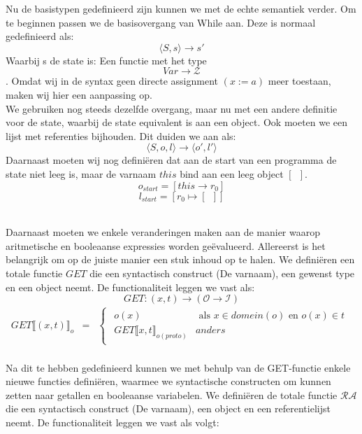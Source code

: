 \documentclass[12pt]{article}
\newcommand{\RA}{\mathcal{RA}}
\begin{document}
Nu de basistypen gedefinieerd zijn kunnen we met de echte semantiek verder. Om te beginnen passen we de basisovergang van While aan. Deze is normaal gedefinieerd als:
$$ \langle S,s \rangle \rightarrow s\prime $$
Waarbij s de state is: Een functie met het type
$$ Var \rightarrow \mathcal{Z} $$.
Omdat wij in de syntax geen directe assignment $(x := a)$ meer toestaan, maken wij hier een aanpassing op.\\
We gebruiken nog steeds dezelfde overgang, maar nu met een andere definitie voor de state, waarbij de state equivalent is aan een object. Ook moeten we een lijst met referenties bijhouden. Dit duiden we aan als:
$$ \langle S,o,l \rangle \rightarrow \langle o\prime, l\prime \rangle $$
Daarnaast moeten wij nog definiëren dat aan de start van een programma de state niet leeg is, maar de varnaam $ this $ bind aan een leeg object $ [\enspace] $.
$$ o_{start} = [this \rightarrow r_0]$$
$$ l_{start} = [r_0 \mapsto [ \enspace ]]$$
\\
\par
Daarnaast moeten we enkele veranderingen maken aan de manier waarop aritmetische en booleaanse expressies worden geëvalueerd. 
Allereerst is het belangrijk om op de juiste manier een stuk inhoud op te halen. We definiëren een totale functie $GET$ die een syntactisch construct (De varnaam), een gewenst type en een object neemt. De functionaliteit leggen we vast als:
\[ GET: (x,t) \rightarrow (\mathcal{O} \rightarrow \mathcal{I}) \]
\[
\begin{matrix}
GET\llbracket (x,t) \rrbracket_o & = & 
\begin{cases}
\begin{matrix}
o(x) & \mbox{ als } x \in domein(o) \mbox{ en } o(x) \in t\\
GET\llbracket x,t \rrbracket_{o(proto)} & anders
\end{matrix}
\end{cases}\\
\end{matrix}
\]

Na dit te hebben gedefinieerd kunnen we met behulp van de GET-functie enkele nieuwe functies definiëren, waarmee we syntactische constructen om kunnen zetten naar getallen en booleaanse variabelen. We definiëren de totale functie $ \RA $ die een syntactisch construct (De varnaam), een object en een referentielijst neemt. De functionaliteit leggen we vast als volgt:
\end{document}
